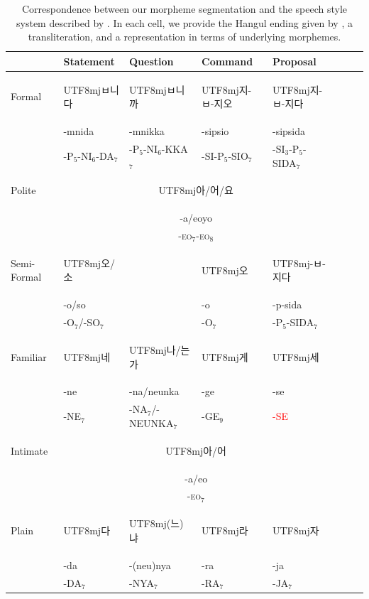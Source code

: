 \documentclass[11pt,letterpaper]{article}
\newcommand{\korean}[1]{\begin{CJK}{UTF8}{mj}#1\end{CJK}}
\begin{document}
\begin{table}
\begin{tabular}{l||l|l|l|llll}
            & Statement & Question  & Command    & Proposal    \\ \hline\hline
Formal      &  \korean{ㅂ니다} & \korean{ㅂ니까} & \korean{지-ㅂ-지오} & \korean{지-ㅂ-지다} \\ 
      &  -mnida & -mnikka  & -sipsio & -sipsida  \\ 
      &  -P$_5$-NI$_6$-DA$_7$ & -P$_5$-NI$_6$-KKA$_7$  & -SI-P$_5$-SIO$_7$ & -SI$_3$-P$_5$-SIDA$_7$ \\ \hline
Polite      &  \multicolumn{4}{c}{\korean{아/어/요}}  \\
      &  \multicolumn{4}{c}{-a/eoyo}  \\
            & \multicolumn{4}{c}{-\textsc{eo}$_7$-\textsc{eo}$_8$} \\ \hline
Semi-Formal & \korean{오/소}   &           &   \korean{오}       &  \korean{-ㅂ-지다} \\
&  -o/so   &           & -o        & -p-sida \\
 &  -O$_7$/-SO$_7$   &           & -O$_7$    & -P$_5$-SIDA$_7$ \\\hline
Familiar    &    \korean{네}    &  \korean{나/는가} &  \korean{게}      &    \korean{세} \\
            & -ne                  & -na/neunka & -ge & -se \\ 
            & -NE$_7$                  & -NA$_7$/-NEUNKA$_7$ & -GE$_9$ & \textcolor{red}{-SE} \\ \hline
Intimate      &  \multicolumn{4}{c}{\korean{아/어}}  \\
      &  \multicolumn{4}{c}{-a/eo}  \\
            & \multicolumn{4}{c}{-\textsc{eo}$_7$} \\ \hline
Plain       &   \korean{다}     &  \korean{(느)냐} &  \korean{라}     &  \korean{자}\\
            &  -da    &  -(neu)nya & -ra      & -ja \\
            & -DA$_7$    &   -NYA$_7$          & -RA$_7$      & -JA$_7$\\
\end{tabular}
\caption{Correspondence between our morpheme segmentation and the speech style system described by \citep[4.3.2]{yeon2010korean}. In each cell, we provide the Hangul ending given by \citep{yeon2010korean}, a transliteration, and a representation in terms of underlying morphemes.}\label{tab:korean-styles}
\end{table}
\end{document}
